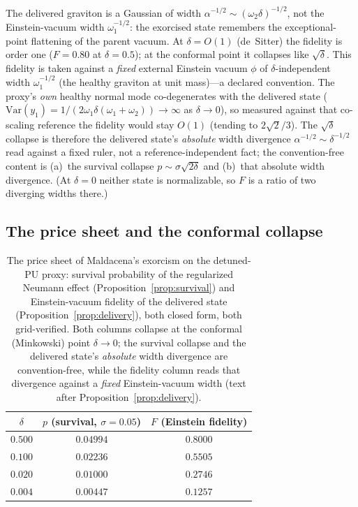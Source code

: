 \documentclass[11pt]{article}
\theoremstyle{definition}
\theoremstyle{remark}
\begin{document}
The delivered graviton is a Gaussian of width $\alpha^{-1/2}
\sim(\omega_{2}\delta)^{-1/2}$, not the Einstein-vacuum width
$\omega_{1}^{-1/2}$: the exorcised state remembers the
exceptional-point flattening of the parent vacuum. At $\delta=O(1)$
(de~Sitter) the fidelity is order one ($F=0.80$ at $\delta=0.5$); at
the conformal point it collapses like $\sqrt{\delta}$. This fidelity is
taken against a \emph{fixed} external Einstein vacuum $\phi$ of
$\delta$-independent width $\omega_{1}^{-1/2}$ (the healthy graviton at
unit mass)---a declared convention. The proxy's \emph{own} healthy
normal mode co-degenerates with the delivered state
($\mathrm{Var}(y_{1})=1/(2\omega_{1}\delta(\omega_{1}+\omega_{2}))\to\infty$
as $\delta\to0$), so measured against that co-scaling reference the
fidelity would stay $O(1)$ (tending to $2\sqrt{2}/3$). The
$\sqrt{\delta}$ collapse is therefore the delivered state's
\emph{absolute} width divergence $\alpha^{-1/2}\sim\delta^{-1/2}$ read
against a fixed ruler, not a reference-independent fact; the
convention-free content is (a)~the survival collapse
$p\sim\sigma\sqrt{2\delta}$ and (b)~that absolute width divergence. (At
$\delta=0$ neither state is normalizable, so $F$ is a ratio of two
diverging widths there.)

\subsection{The price sheet and the conformal collapse}
\label{sec:pricesheet}

\begin{table}[ht]
\centering
\begin{tabular}{ccc}
\toprule
$\delta$ & $p$ (survival, $\sigma=0.05$) & $F$ (Einstein fidelity) \\
\midrule
$0.500$ & $0.04994$ & $0.8000$ \\
$0.100$ & $0.02236$ & $0.5505$ \\
$0.020$ & $0.01000$ & $0.2746$ \\
$0.004$ & $0.00447$ & $0.1257$ \\
\bottomrule
\end{tabular}
\caption{The price sheet of Maldacena's exorcism on the detuned-PU
proxy: survival probability of the regularized Neumann effect
(Proposition~\ref{prop:survival}) and Einstein-vacuum fidelity of the
delivered state (Proposition~\ref{prop:delivery}), both closed form,
both grid-verified. Both columns collapse at the conformal
(Minkowski) point $\delta\to0$; the survival collapse and the delivered
state's \emph{absolute} width divergence are convention-free, while the
fidelity column reads that divergence against a \emph{fixed}
Einstein-vacuum width (text after Proposition~\ref{prop:delivery}).}
\label{tab:pricesheet}
\end{table}
\end{document}
